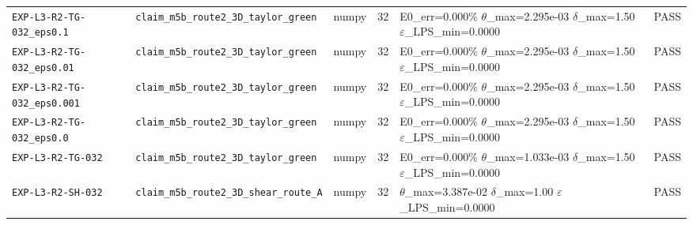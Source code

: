 {\begin{longtable}{@{}>{\raggedright\arraybackslash}p{} >{\raggedright\arraybackslash}p{} l l >{\raggedright\arraybackslash}p{} l@{}}
\texttt{EXP-\allowbreak{}L3-\allowbreak{}R2-\allowbreak{}TG-\allowbreak{}032\_\allowbreak{}eps0.1} & \texttt{claim\_\allowbreak{}m5b\_\allowbreak{}route2\_\allowbreak{}3D\_\allowbreak{}taylor\_\allowbreak{}green} & numpy & 32 & E0\_\allowbreak{}err=\allowbreak{}0.000\%  $\theta$\_\allowbreak{}max=\allowbreak{}2.295e-03  $\delta$\_\allowbreak{}max=\allowbreak{}1.50  $\varepsilon$\_\allowbreak{}LPS\_\allowbreak{}min=\allowbreak{}0.0000 & \textsf{PASS}\\
\texttt{EXP-\allowbreak{}L3-\allowbreak{}R2-\allowbreak{}TG-\allowbreak{}032\_\allowbreak{}eps0.01} & \texttt{claim\_\allowbreak{}m5b\_\allowbreak{}route2\_\allowbreak{}3D\_\allowbreak{}taylor\_\allowbreak{}green} & numpy & 32 & E0\_\allowbreak{}err=\allowbreak{}0.000\%  $\theta$\_\allowbreak{}max=\allowbreak{}2.295e-03  $\delta$\_\allowbreak{}max=\allowbreak{}1.50  $\varepsilon$\_\allowbreak{}LPS\_\allowbreak{}min=\allowbreak{}0.0000 & \textsf{PASS}\\
\texttt{EXP-\allowbreak{}L3-\allowbreak{}R2-\allowbreak{}TG-\allowbreak{}032\_\allowbreak{}eps0.001} & \texttt{claim\_\allowbreak{}m5b\_\allowbreak{}route2\_\allowbreak{}3D\_\allowbreak{}taylor\_\allowbreak{}green} & numpy & 32 & E0\_\allowbreak{}err=\allowbreak{}0.000\%  $\theta$\_\allowbreak{}max=\allowbreak{}2.295e-03  $\delta$\_\allowbreak{}max=\allowbreak{}1.50  $\varepsilon$\_\allowbreak{}LPS\_\allowbreak{}min=\allowbreak{}0.0000 & \textsf{PASS}\\
\texttt{EXP-\allowbreak{}L3-\allowbreak{}R2-\allowbreak{}TG-\allowbreak{}032\_\allowbreak{}eps0.0} & \texttt{claim\_\allowbreak{}m5b\_\allowbreak{}route2\_\allowbreak{}3D\_\allowbreak{}taylor\_\allowbreak{}green} & numpy & 32 & E0\_\allowbreak{}err=\allowbreak{}0.000\%  $\theta$\_\allowbreak{}max=\allowbreak{}2.295e-03  $\delta$\_\allowbreak{}max=\allowbreak{}1.50  $\varepsilon$\_\allowbreak{}LPS\_\allowbreak{}min=\allowbreak{}0.0000 & \textsf{PASS}\\
\texttt{EXP-\allowbreak{}L3-\allowbreak{}R2-\allowbreak{}TG-\allowbreak{}032} & \texttt{claim\_\allowbreak{}m5b\_\allowbreak{}route2\_\allowbreak{}3D\_\allowbreak{}taylor\_\allowbreak{}green} & numpy & 32 & E0\_\allowbreak{}err=\allowbreak{}0.000\%  $\theta$\_\allowbreak{}max=\allowbreak{}1.033e-03  $\delta$\_\allowbreak{}max=\allowbreak{}1.50  $\varepsilon$\_\allowbreak{}LPS\_\allowbreak{}min=\allowbreak{}0.0000 & \textsf{PASS}\\
\texttt{EXP-\allowbreak{}L3-\allowbreak{}R2-\allowbreak{}SH-\allowbreak{}032} & \texttt{claim\_\allowbreak{}m5b\_\allowbreak{}route2\_\allowbreak{}3D\_\allowbreak{}shear\_\allowbreak{}route\_\allowbreak{}A} & numpy & 32 & $\theta$\_\allowbreak{}max=\allowbreak{}3.387e-02  $\delta$\_\allowbreak{}max=\allowbreak{}1.00  $\varepsilon$\_\allowbreak{}LPS\_\allowbreak{}min=\allowbreak{}0.0000 & \textsf{PASS}\\

\end{longtable}}
